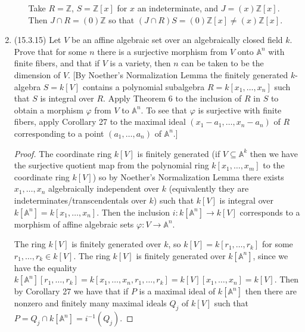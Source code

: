 \documentclass[11pt]{article}
\begin{document}
\begin{enumerate}
\begin{enumerate}
        Take $R = \mathbb{Z}$, $S = \mathbb{Z}[x]$ for $x$ an indeterminate, and $J = (x)\mathbb{Z}[x]$. Then $J\cap R = (0)\mathbb{Z}$ so that $(J\cap R)S = (0)\mathbb{Z}[x]\neq (x)\mathbb{Z}[x]$.
    \end{enumerate}
    \item (15.3.15) Let $V$ be an affine algebraic set over an algebraically closed field $k$. Prove that for some $n$ there is a surjective morphism from $V$ onto $\mathbb{A}^n$ with finite fibers, and that if $V$ is a variety, then $n$ can be taken to be the dimension of $V$. [By Noether's Normalization Lemma the finitely generated $k$-algebra $S = k[V]$ contains a polynomial subalgebra $R = k[x_1,\dots,x_n]$ such that $S$ is integral over $R$. Apply Theorem 6 to the inclusion of $R$ in $S$ to obtain a morphism $\varphi$ from $V$ to $\mathbb{A}^n$. To see that $\varphi$ is surjective with finite fibers, apply Corollary 27 to the maximal ideal $(x_1-a_1,\dots,x_n-a_n)$ of $R$ corresponding to a point $(a_1,\dots,a_n)$ of $\mathbb{A}^n$.] \begin{proof}
        The coordinate ring $k[V]$ is finitely generated (if $V\subseteq \mathbb{A}^k$ then we have the surjective quotient map from the polynomial ring $k[x_1,\dots,x_m]$ to the coordinate ring $k[V]$) so by Noether's Normalization Lemma there exists $x_1,\dots,x_n$ algebraically independent over $k$ (equivalently they are indeterminates/transcendentals over $k$) such that $k[V]$ is integral over $k[\mathbb{A}^n] = k[x_1,\dots,x_n]$. Then the inclusion $i\colon k[\mathbb{A}^n]\to k[V]$ corresponds to a morphism of affine algebraic sets $\varphi\colon V\to \mathbb{A}^n$.

        The ring $k[V]$ is finitely generated over $k$, so $k[V] = k[r_1,\dots,r_k]$ for some $r_1,\dots,r_k\in k[V]$. The ring $k[V]$ is finitely generated over $k[\mathbb{A}^n]$, since we have the equality $k[\mathbb{A}^n][r_1,\dots,r_k] = k[x_1,\dots ,x_n,r_1,\dots,r_k] = k[V][x_1,\dots,x_n] = k[V]$. Then by Corollary 27 we have that if $P$ is a maximal ideal of $k[\mathbb{A}^n]$ then there are nonzero and finitely many maximal ideals $Q_j$ of $k[V]$ such that $P = Q_j\cap k[\mathbb{A}^n] = i^{-1}(Q_j)$.


\end{proof}
\end{enumerate}
\end{document}
